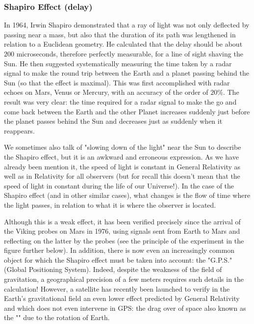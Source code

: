 	\subsubsection{Shapiro Effect (delay)}\label{shapiro effect}
	In 1964,  Irwin Shapiro demonstrated that a ray of light was not only deflected by passing near a mass, but also that the duration of its path was lengthened in relation to a Euclidean geometry. He calculated that the delay should be about $200$ microseconds, therefore perfectly measurable, for a line of sight shaving the Sun. He then suggested systematically measuring the time taken by a radar signal to make the round trip between the Earth and a planet passing behind the Sun (so that the effect is maximal). This was first accomplished with radar echoes on Mars, Venus or Mercury, with an accuracy of the order of $20\%$. The result was very clear: the time required for a radar signal to make the go and come back between the Earth and the other Planet increases suddenly just before the planet passes behind the Sun and decreases just as suddenly when it reappears.
	\begin{tcolorbox}[title=Remark,colframe=black,arc=10pt]
	We sometimes also talk of "slowing down of the light" near the Sun to describe the Shapiro effect, but it is an awkward and erroneous expression. As we have already been mention it, the speed of light is constant in General Relativity as well as in Relativity for all observers (but for recall this doesn't mean that the speed of light in constant during the life of our Universe!). In the case of the Shapiro effect (and in other similar cases), what changes is the flow of time where the light passes, in relation to what it is where the observer is located.
	\end{tcolorbox}
	Although this is a weak effect, it has been verified precisely since the arrival of the Viking probes on Mars in 1976, using signals sent from Earth to Mars and reflecting on the latter by the probes (see the principle of the experiment in the figure further below). In addition, there is now even an increasingly common object for which the Shapiro effect must be taken into account: the "G.P.S." (Global Positioning System). Indeed, despite the weakness of the field of gravitation, a geographical precision of a few meters requires such details in the calculation! However, a satellite has recently been launched to verify in the Earth's gravitational field an even lower effect predicted by General Relativity and which does not even intervene in GPS: the drag over of space also known as the "" due to the rotation of Earth.
	
